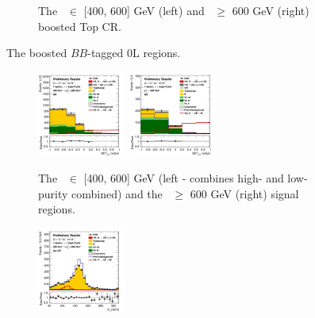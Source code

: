 \begin{figure}[h!]
\begin{subfigure}[b]{\textwidth}
        \caption{The \ptv\ $\in$ [400, 600] GeV (left) and \ptv\ $\geq$ 600 GeV (right) boosted Top CR.}
        \label{fig:plots_VHbbBoost_OL_topCR}
    \end{subfigure}
    \caption{The boosted $BB$-tagged 0L regions.}
    \label{fig:plots_VHbbBoost_OL}
\end{figure} 



\begin{figure}[h!]
    \centering
    \begin{subfigure}[b]{\textwidth}
        \centering
        \includegraphics[width=0.32\textwidth]{Images/VH/Own_fit/postfit_VHbb/Region_distmva_BMax600_BMin400_incFat1_Fat1_DSRnoaddbjetsr_J0_TTypebb_incJet1_T2_L1_Y6051_GlobalFit_conditionnal_mu1.png}
        \includegraphics[width=0.32\textwidth]{Images/VH/Own_fit/postfit_VHbb/Region_distmva_BMin600_incFat1_Fat1_DSRnoaddbjetsr_J0_TTypebb_incJet1_T2_L1_Y6051_GlobalFit_conditionnal_mu1.png}
        \caption{The \ptv\ $\in$ [400, 600] GeV (left - combines high- and low-purity combined) and the \ptv\ $\geq$ 600 GeV (right) signal regions.}
        \label{fig:plots_VHbbBoost_1L_SR}
    \end{subfigure}
    \begin{subfigure}[b]{\textwidth}
        \centering
        \includegraphics[width=0.32\textwidth]{Images/VH/Own_fit/postfit_VHbb/Region_distmBB_BMax600_BMin400_incFat1_Fat1_DSRtopaddbjetcr_J0_TTypebb_incJet1_T2_L1_Y6051_GlobalFit_conditionnal_mu1.png}

\end{subfigure}
\end{figure}
